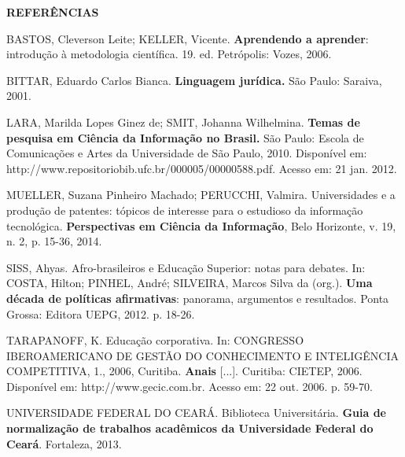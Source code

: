 \newpage

\begin{center}
    \textbf{REFERÊNCIAS}
\end{center}

\jump

{\parindent0pt %

BASTOS, Cleverson Leite; KELLER, Vicente. \textbf{Aprendendo a aprender}: introdução à metodologia científica. 19. ed. Petrópolis: Vozes, 2006.

\jump

BITTAR, Eduardo Carlos Bianca. \textbf{Linguagem jurídica.} São Paulo: Saraiva, 2001.

\jump

LARA, Marilda Lopes Ginez de; SMIT, Johanna Wilhelmina. \textbf{Temas de pesquisa em Ciência da Informação no Brasil.} São Paulo: Escola de Comunicações e Artes da Universidade de São Paulo, 2010. Disponível em:
http://www.repositoriobib.ufc.br/000005/00000588.pdf. Acesso em: 21 jan. 2012.

\jump

MUELLER, Suzana Pinheiro Machado; PERUCCHI, Valmira. Universidades e a produção de patentes: tópicos de interesse para o estudioso da informação tecnológica. \textbf{Perspectivas em Ciência da Informação}, Belo Horizonte, v. 19, n. 2, p. 15-36, 2014.

\jump

SISS, Ahyas. Afro-brasileiros e Educação Superior: notas para debates. In: COSTA, Hilton; PINHEL, André; SILVEIRA, Marcos Silva da (org.). \textbf{Uma década de políticas afirmativas}: panorama, argumentos e resultados. Ponta Grossa: Editora UEPG, 2012. p. 18-26.

\jump

TARAPANOFF, K. Educação corporativa. In: CONGRESSO IBEROAMERICANO DE
GESTÃO DO CONHECIMENTO E INTELIGÊNCIA COMPETITIVA, 1., 2006, Curitiba.
\textbf{Anais} [...]. Curitiba: CIETEP, 2006. Disponível em: http://www.gecic.com.br. Acesso em: 22 out. 2006. p. 59-70.

\jump

UNIVERSIDADE FEDERAL DO CEARÁ. Biblioteca Universitária. \textbf{Guia de normalização de trabalhos acadêmicos da Universidade Federal do Ceará}. Fortaleza, 2013.

}


